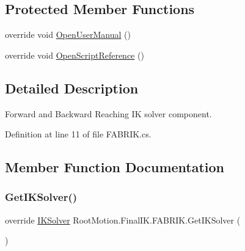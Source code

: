\subsection*{Protected Member Functions}
\begin{DoxyCompactItemize}
\item 
override void \mbox{\hyperlink{class_root_motion_1_1_final_i_k_1_1_f_a_b_r_i_k_a05b2d0586050c16146e02cde8a0e1b11}{Open\+User\+Manual}} ()
\item 
override void \mbox{\hyperlink{class_root_motion_1_1_final_i_k_1_1_f_a_b_r_i_k_aac64228ef162eaa3e39a159400e7f6d4}{Open\+Script\+Reference}} ()
\end{DoxyCompactItemize}


\subsection{Detailed Description}
Forward and Backward Reaching IK solver component. 



Definition at line 11 of file F\+A\+B\+R\+I\+K.\+cs.



\subsection{Member Function Documentation}
\mbox{\label{class_root_motion_1_1_final_i_k_1_1_f_a_b_r_i_k_a981c902f3f99de1bc37988fbd2226ce7}} 
\subsubsection{\texorpdfstring{Get\+I\+K\+Solver()}{GetIKSolver()}}
{\footnotesize\ttfamily override \mbox{\hyperlink{class_root_motion_1_1_final_i_k_1_1_i_k_solver}{I\+K\+Solver}} Root\+Motion.\+Final\+I\+K.\+F\+A\+B\+R\+I\+K.\+Get\+I\+K\+Solver (\begin{DoxyParamCaption}{ }\end{DoxyParamCaption})\hspace{0.3cm}{\ttfamily [virtual]}}



